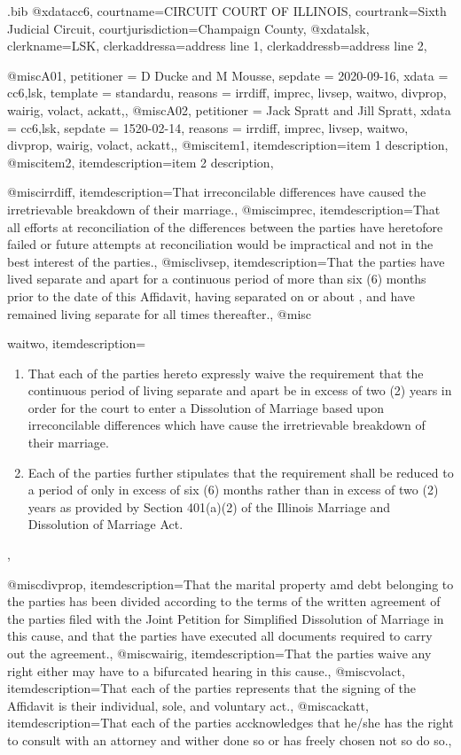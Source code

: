 \begin{filecontents*}[overwrite]{\jobname.bib}
@xdata{cc6,
courtname={CIRCUIT COURT OF ILLINOIS},
courtrank={Sixth Judicial Circuit},
courtjurisdiction={Champaign County},
}
@xdata{lsk,
clerkname={LSK},
clerkaddressa={address line 1},
clerkaddressb={address line 2},
}

@misc{A01,
    petitioner = {D Ducke and M Mousse},
    sepdate = {2020-09-16},
    xdata = {cc6,lsk},
    template = {standardu},
    reasons = {irrdiff, imprec, livsep, waitwo, divprop, wairig, volact,  ackatt,},
}
@misc{A02,
    petitioner = {Jack Spratt and Jill Spratt},
    xdata = {cc6,lsk},
    sepdate = {1520-02-14},
    reasons = {irrdiff, imprec, livsep, waitwo, divprop, wairig, volact,  ackatt,},
}
@misc{item1,
itemdescription={item 1 description},
}
@misc{item2,
itemdescription={item 2 description},
}

@misc{irrdiff,
itemdescription={That irreconcilable differences have caused the irretrievable breakdown of their marriage.},
}
@misc{imprec,
itemdescription={That all efforts at reconciliation of the differences between the parties have heretofore failed or future attempts at reconciliation would be impractical and not in the best interest of the parties.},
}
@misc{livsep,
itemdescription={That the parties have lived separate and apart for a continuous period of more than six (6) months prior to the date of this Affidavit, having separated on or about \usebox{\sbdate}, and have remained living separate for all times thereafter.},
}
@misc{waitwo,
itemdescription={\vspace{-\itemsep}\vspace{-\baselineskip}\begin{enumerate}[topsep=0pt]\item That each of the parties hereto expressly waive the requirement that the continuous period of living separate and apart be in excess of two (2) years in order for the court to enter a Dissolution of  Marriage based upon irreconcilable differences which have cause the irretrievable breakdown of their marriage.\item  Each of the parties further stipulates that the requirement shall be reduced to a period of only in excess of six (6) months rather than in excess of two (2) years as provided by Section 401(a)(2) of the Illinois Marriage and Dissolution of Marriage Act. \end{enumerate}},
}
@misc{divprop,
itemdescription={That the marital property amd debt belonging to the parties has been divided according to the terms of the written agreement of the parties filed with the Joint Petition for Simplified Dissolution of Marriage    in this cause, and that the parties have executed all documents required to carry out the agreement.},
}
@misc{wairig,
itemdescription={That the parties waive any right either may have to a bifurcated hearing in this cause.},
}
@misc{volact,
itemdescription={That each of the parties represents that the signing of the Affidavit is their individual, sole, and voluntary act.},
}
@misc{ackatt,
itemdescription={That each of the parties accknowledges that he/she has the right to consult with an attorney and wither done so or has freely chosen not so do so.},
}
\end{filecontents*}
